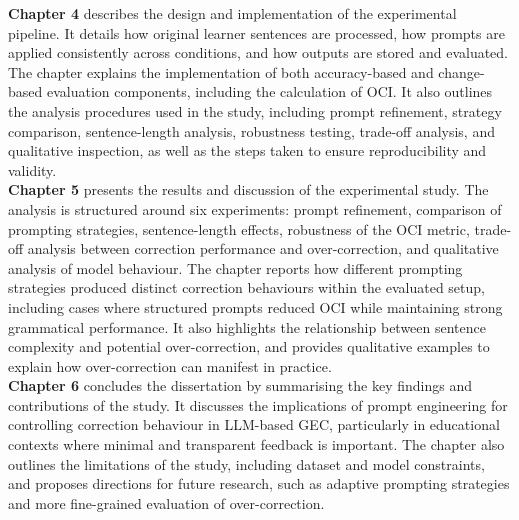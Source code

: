 \textbf{Chapter 4} describes the design and implementation of the experimental pipeline. It details how original learner sentences are processed, how prompts are applied consistently across conditions, and how outputs are stored and evaluated. The chapter explains the implementation of both accuracy-based and change-based evaluation components, including the calculation of OCI. It also outlines the analysis procedures used in the study, including prompt refinement, strategy comparison, sentence-length analysis, robustness testing, trade-off analysis, and qualitative inspection, as well as the steps taken to ensure reproducibility and validity.\\

\textbf{Chapter 5} presents the results and discussion of the experimental study. The analysis is structured around six experiments: prompt refinement, comparison of prompting strategies, sentence-length effects, robustness of the OCI metric, trade-off analysis between correction performance and over-correction, and qualitative analysis of model behaviour. The chapter reports how different prompting strategies produced distinct correction behaviours within the evaluated setup, including cases where structured prompts reduced OCI while maintaining strong grammatical performance. It also highlights the relationship between sentence complexity and potential over-correction, and provides qualitative examples to explain how over-correction can manifest in practice.\\

\textbf{Chapter 6} concludes the dissertation by summarising the key findings and contributions of the study. It discusses the implications of prompt engineering for controlling correction behaviour in LLM-based GEC, particularly in educational contexts where minimal and transparent feedback is important. The chapter also outlines the limitations of the study, including dataset and model constraints, and proposes directions for future research, such as adaptive prompting strategies and more fine-grained evaluation of over-correction.\\

